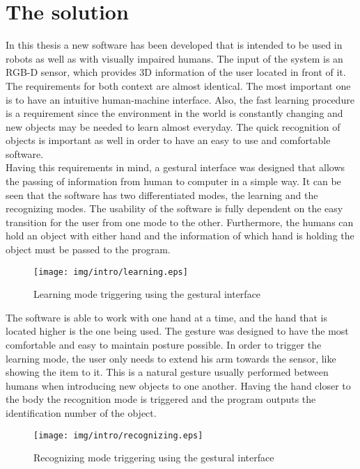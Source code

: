 \section{The solution}

In this thesis a new software has been developed that is intended to be used in robots as well as with visually impaired humans. The input of the system is an RGB-D sensor, which provides 3D information of the user located in front of it. 
\\

The requirements for both context are almost identical. The most important one is to have an intuitive human-machine interface. Also, the fast learning procedure is a requirement since the environment in the world is constantly changing and new objects may be needed to learn almost everyday. The quick recognition of objects is important as well in order to have an easy to use and comfortable software. 
\\

Having this requirements in mind, a gestural interface was designed that allows the passing of information from human to computer in a simple way. It can be seen that the software has two differentiated modes, the learning and the recognizing modes. The usability of the software is fully dependent on the easy transition for the user from one mode to the other. 
Furthermore, the humans can hold an object with either hand and the information of which hand is holding the object must be passed to the program. 


\begin{figure}[H]
	\centering
    \texttt{[image: img/intro/learning.eps]}
	\caption[Learning Mode Triggering]{Learning mode triggering using the gestural interface}
\end{figure}

The software is able to work with one hand at a time, and the hand that is located higher is the one being used. The gesture was designed to have the most comfortable and easy to maintain posture possible. In order to trigger the learning mode, the user only needs to extend his arm towards the sensor, like showing the item to it. This is a natural gesture usually performed between humans when introducing new objects to one another. Having the hand closer to the body the recognition mode is triggered and the program outputs the identification number of the object. 



\begin{figure}[H]
	\centering
    \texttt{[image: img/intro/recognizing.eps]}
	\caption[Recognizing Mode Triggering]{Recognizing mode triggering using the gestural interface}
\end{figure}



